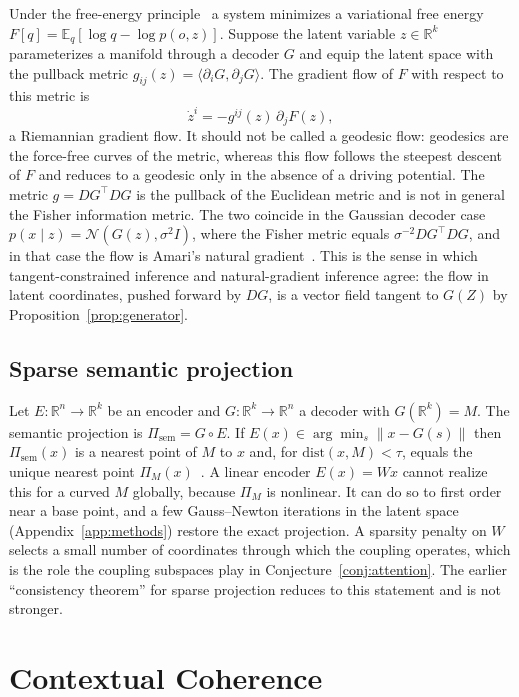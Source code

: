 \documentclass[11pt,a4paper]{article}
\theoremstyle{definition}
\theoremstyle{remark}
\newcommand{\R}{\mathbb{R}}
\newcommand{\dist}{\mathrm{dist}}
\begin{document}
Under the free-energy principle~\cite{friston2010freeenergy,parr2022active}
a system minimizes a variational free energy
$F[q]=\mathbb{E}_q[\log q-\log p(o,z)]$. Suppose the latent variable
$z\in\R^k$ parameterizes a manifold through a decoder $G$ and equip the
latent space with the pullback metric $g_{ij}(z)=\langle\partial_iG,\partial_jG\rangle$.
The gradient flow of $F$ with respect to this metric is
\[
\dot z^i=-g^{ij}(z)\,\partial_jF(z),
\]
a Riemannian gradient flow. It should not be called a geodesic flow:
geodesics are the force-free curves of the metric, whereas this flow follows
the steepest descent of $F$ and reduces to a geodesic only in the absence of
a driving potential. The metric $g=DG^\top DG$ is the pullback of the
Euclidean metric and is not in general the Fisher information metric. The
two coincide in the Gaussian decoder case $p(x\mid z)=\mathcal{N}(G(z),\sigma^2I)$,
where the Fisher metric equals $\sigma^{-2}DG^\top DG$, and in that case the
flow is Amari's natural gradient~\cite{amari1998natural,amari2000methods}.
This is the sense in which tangent-constrained inference and natural-gradient
inference agree: the flow in latent coordinates, pushed forward by $DG$, is a
vector field tangent to $G(Z)$ by Proposition~\ref{prop:generator}.

\subsection{Sparse semantic projection}

Let $E:\R^n\to\R^k$ be an encoder and $G:\R^k\to\R^n$ a decoder with
$G(\R^k)=M$. The semantic projection is $\Pi_{\mathrm{sem}}=G\circ E$. If
$E(x)\in\arg\min_s\|x-G(s)\|$ then $\Pi_{\mathrm{sem}}(x)$ is a nearest point
of $M$ to $x$ and, for $\dist(x,M)<\tau$, equals the unique nearest point
$\Pi_M(x)$~\cite{federer1959curvature}. A linear encoder $E(x)=Wx$ cannot realize this
for a curved $M$ globally, because $\Pi_M$ is nonlinear. It can do so to
first order near a base point, and a few Gauss--Newton iterations in the
latent space (Appendix~\ref{app:methods}) restore the exact projection. A
sparsity penalty on $W$ selects a small number of coordinates through which
the coupling operates, which is the role the coupling subspaces play in
Conjecture~\ref{conj:attention}. The earlier ``consistency theorem'' for
sparse projection reduces to this statement and is not stronger.

\section{Contextual Coherence}\label{sec:coherence}
\end{document}
